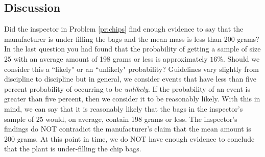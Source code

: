 \documentclass{ximera}
\begin{document}
\subsection{Discussion} Did the inspector in Problem \ref{pr:chips} find enough evidence to say that the manufacturer is under-filling the bags and the mean mass is less than 200 grams?  In the last question you had found that the probability of getting a sample of size 25 with an average amount of 198 grams or less is approximately $16\%$.  Should we consider this a ``likely" or an ``unlikely" probability?  Guidelines vary slightly from discipline to discipline but in general, we consider events that have less than five percent probability of occurring to be \emph{unlikely}.  If the probability of an event is greater than five percent, then we consider it to be reasonably likely.  With this in mind, we can say that it is reasonably likely that the bags in the inspector's sample of 25 would, on average, contain 198 grams or less. The inspector's findings do NOT contradict the manufacturer's claim that the mean amount is 200 grams.  At this point in time, we do NOT have enough evidence to conclude that the plant is under-filling the chip bags.

\end{document}
